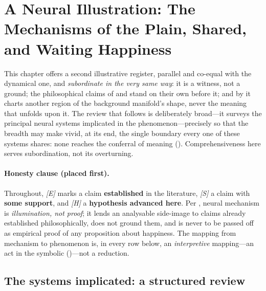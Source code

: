 \section{A Neural Illustration: The Mechanisms of the Plain, Shared, and Waiting Happiness}
\label{p19:sec:neuro}

\noindent
This chapter offers a second illustrative register, parallel and co-equal with the dynamical one, and \emph{subordinate in the very same way}: it is a witness, not a ground; the philosophical claims of  and  stand on their own before it; and by  it charts another region of the background manifold's shape, never the meaning that unfolds upon it. The review that follows is deliberately broad---it surveys the principal neural systems implicated in the phenomenon---precisely so that the breadth may make vivid, at its end, the single boundary every one of these systems shares: none reaches the conferral of meaning (). Comprehensiveness here serves subordination, not its overturning.

\paragraph{Honesty clause (placed first).} Throughout, \emph{[E]} marks a claim \textbf{established} in the literature, \emph{[S]} a claim with \textbf{some support}, and \emph{[H]} a \textbf{hypothesis advanced here}. Per , neural mechanism is \emph{illumination, not proof}; it lends an analysable side-image to claims already established philosophically, does not ground them, and is never to be passed off as empirical proof of any proposition about happiness. The mapping from mechanism to phenomenon is, in every row below, an \emph{interpretive} mapping---an act in the symbolic ()---not a reduction.

\subsection{The systems implicated: a structured review}
\label{p19:sub:neuro-systems}

